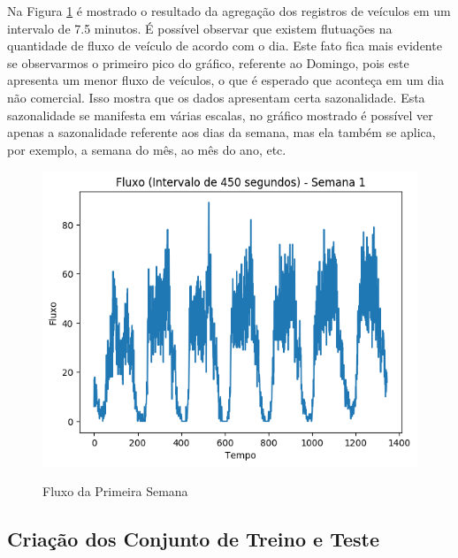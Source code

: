 Na Figura \ref{figure:flow_discution} é mostrado o resultado da agregação dos registros de veículos em um intervalo de 7.5 minutos. É possível observar que existem flutuações na quantidade de fluxo de veículo de acordo com o dia. Este fato fica mais evidente se observarmos o primeiro pico do gráfico, referente ao Domingo, pois este apresenta um menor fluxo de veículos, o que é esperado que aconteça em um dia não comercial. Isso mostra que os dados apresentam certa sazonalidade. Esta sazonalidade se manifesta em várias escalas, no gráfico mostrado é possível ver apenas a sazonalidade referente aos dias da semana, mas ela também se aplica, por exemplo, a semana do mês, ao mês do ano, etc. 

\begin{figure}[H]
    \centering
    \includegraphics[scale=1]{monography/img/flows/flow_450_week_01.png}
    \label{figure:flow_discution}
    \caption[Fluxo da Primeira Semana]{Fluxo da Primeira Semana}
\end{figure}


\subsection{Criação dos Conjunto de Treino e Teste}

